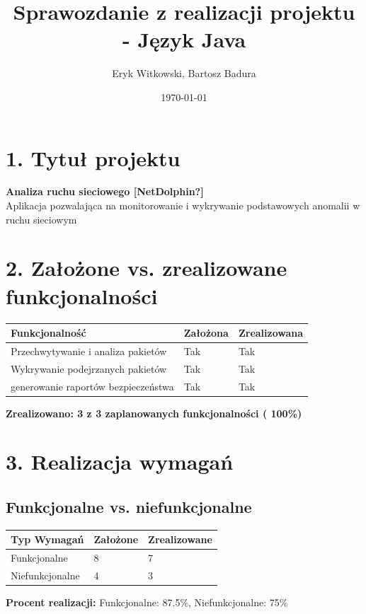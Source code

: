 \documentclass[a4paper,12pt]{article}
\title{Sprawozdanie z realizacji projektu - Język Java}
\author{Eryk Witkowski, Bartosz Badura}
\date{\today}
\begin{document}
\maketitle

\section*{1. Tytuł projektu}
\textbf{Analiza ruchu sieciowego [NetDolphin?]}\\
Aplikacja pozwalająca na monitorowanie i wykrywanie podstawowych anomalii w ruchu sieciowym

\section*{2. Założone vs. zrealizowane funkcjonalności}

\begin{longtable}{|p{6cm}|p{4cm}|p{4cm}|}
\hline
\textbf{Funkcjonalność} & \textbf{Założona} & \textbf{Zrealizowana} \\
\hline
Przechwytywanie i analiza pakietów & Tak & Tak \\
\hline
Wykrywanie podejrzanych pakietów & Tak & Tak \\
\hline
generowanie raportów bezpieczeństwa & Tak & Tak \\
\hline
\end{longtable}

\textbf{Zrealizowano: 3 z 3 zaplanowanych funkcjonalności ( 100\%)}

\section*{3. Realizacja wymagań}

\subsection*{Funkcjonalne vs. niefunkcjonalne}

\begin{longtable}{|p{6cm}|p{4cm}|p{4cm}|}
\hline
\textbf{Typ Wymagań} & \textbf{Założone} & \textbf{Zrealizowane} \\
\hline
Funkcjonalne & 8 & 7 \\
\hline
Niefunkcjonalne & 4 & 3 \\
\hline
\end{longtable}

\textbf{Procent realizacji:} Funkcjonalne: 87.5\%, Niefunkcjonalne: 75\%
\end{document}
